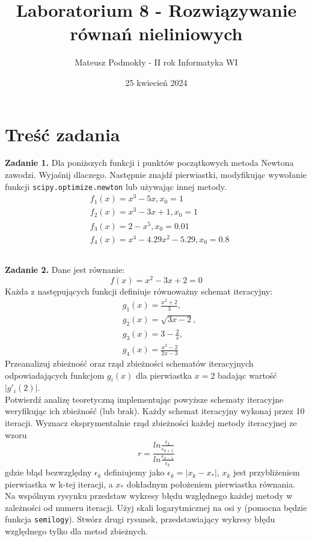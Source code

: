 \documentclass[11pt, leqno]{scrartcl}
\title{Laboratorium 8 - Rozwiązywanie równań nieliniowych}
\author{Mateusz Podmokły - II rok Informatyka WI}
\date{25 kwiecień 2024}
\begin{document}
    \maketitle
    \section{Treść zadania}
    \textbf{Zadanie 1.}
    Dla poniższych funkcji i punktów początkowych metoda
    Newtona zawodzi. Wyjaśnij dlaczego. Następnie znajdź
    pierwiastki, modyfikując wywołanie funkcji
    \texttt{scipy.optimize.newton} lub używając innej
    metody.
    \begin{align*}
        &f_1(x)=x^3-5x,x_0=1 \\
        &f_2(x)=x^3-3x+1,x_0=1 \\
        &f_3(x)=2-x^5,x_0=0.01 \\
        &f_4(x)=x^4-4.29x^2-5.29,x_0=0.8
    \end{align*}

    \subsection*{}
    \textbf{Zadanie 2.} Dane jest równanie:
    \[
        f(x)=x^2-3x+2=0
    \]
    Każda z następujących funkcji definiuje równoważny
    schemat iteracyjny:
    \begin{align*}
        &g_1(x)=\frac{x^2+2}{3}, \\
        &g_2(x)=\sqrt{3x-2}, \\
        &g_3(x)=3-\frac{2}{x}, \\
        &g_4(x)=\frac{x^2-2}{2x-3}
    \end{align*}
    Przeanalizuj zbieżność oraz rząd zbieżności schematów
    iteracyjnych odpowiadających funkcjom $g_i(x)$ dla
    pierwiastka $x=2$ badając wartość $|g'_i(2)|$. \\
    Potwierdź analizę teoretyczną implementując powyższe
    schematy iteracyjne weryﬁkując ich zbieżność (lub brak).
    Każdy schemat iteracyjny wykonaj przez 10 iteracji.
    Wyznacz eksprymentalnie rząd zbieżności każdej metody
    iteracyjnej ze wzoru
    \[
        r=\frac{ln\frac{\epsilon_k}{\epsilon_{k+1}}}
            {ln\frac{\epsilon_{k-1}}{\epsilon_k}}
    \]
    gdzie błąd bezwzględny $\epsilon_k$ definiujemy jako
    $\epsilon_k=|x_k-x_*|$, $x_k$ jest przybliżeniem
    pierwiastka w k-tej iteracji, a $x_*$ dokładnym
    położeniem pierwiastka równania. \\
    Na wspólnym rysynku przedstaw wykresy błędu względnego
    każdej metody w zależności od numeru iteracji. Użyj
    skali logarytmicznej na osi y (pomocna będzie funkcja
    \texttt{semilogy}). Stwórz drugi rysunek, przedstawiający
    wykresy błędu względnego tylko dla metod zbieżnych.
\end{document}
